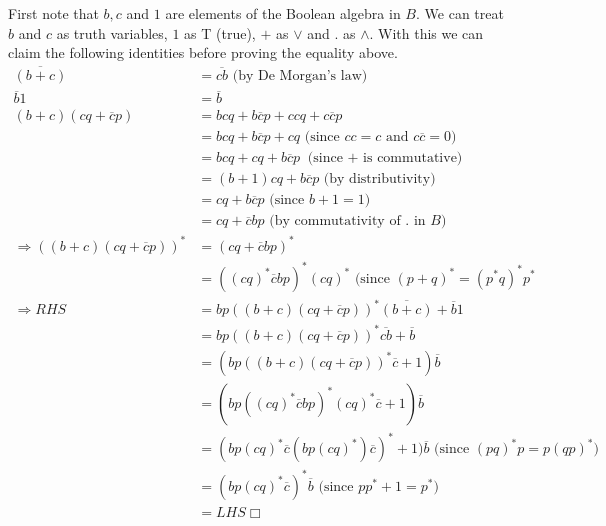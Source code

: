 First note that $b, c$ and $1$ are elements of the Boolean algebra in $B$. We can treat $b$ and $c$ as truth variables, $1$ as T (true), $+$ as $\vee$ and $.$ as $\wedge$. With this we can claim the following identities before proving the equality above.
\begin{align*}
\overline{(b+c)} &= \overline {cb} \text{ (by De Morgan's law)}\\
\overline b 1 &= \overline b\\
(b + c)(cq + \overline c p) &= bcq + b \overline c p + ccq + c \overline c p\\
&= bcq + b \overline c p + cq \text{ (since $cc = c$ and $c \overline c = 0$)}\\
&= bcq + cq + b \overline c p \text{ (since $+$ is commutative)}\\
&= (b+1)cq + b \overline c p \text{ (by distributivity)}\\
&= cq + b \overline c p \text{ (since $b + 1 = 1$)}\\
&= cq + \overline c b p \text{ (by commutativity of $.$ in $B$)}\\
\Rightarrow ((b + c)(cq + \overline c p))^* &= (cq + \overline c b p)^*\\
&= ((cq)^*\overline c b p)^* (cq)^* \text{ (since $(p+q)^* = (p^*q)^*p^*$}\\
\Rightarrow RHS &= bp((b + c)(cq + \overline c p))^*\overline{(b+c)}+ \overline b 1\\
&= bp((b + c)(cq + \overline c p))^*\overline{cb}+ \overline b\\
&= (bp((b + c)(cq + \overline c p))^*\overline c + 1)\overline b\\
&= (bp((cq)^*\overline c b p)^* (cq)^*\overline c + 1)\overline b\\
&= (bp(cq)^*\overline c (b p (cq)^*)\overline c)^* + 1)\overline b \text{ (since $(pq)^*p = p(qp)^*$)}\\
&= (bp(cq)^*\overline c)^*\overline b \text{ (since $pp^* +1 = p^*$)}\\
&= LHS \Box
\end{align*}